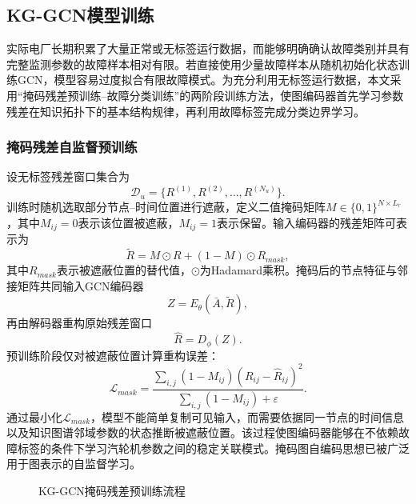 \subsection{KG-GCN模型训练}
\label{subsec:kg_gcn_training_v2}

实际电厂长期积累了大量正常或无标签运行数据，而能够明确确认故障类别并具有完整监测参数的故障样本相对有限。若直接使用少量故障样本从随机初始化状态训练GCN，模型容易过度拟合有限故障模式。为充分利用无标签运行数据，本文采用“掩码残差预训练--故障分类训练”的两阶段训练方法，使图编码器首先学习参数残差在知识拓扑下的基本结构规律，再利用故障标签完成分类边界学习。

\subsubsection{掩码残差自监督预训练}

设无标签残差窗口集合为
\begin{equation}
    \mathcal D_u=\{R^{(1)},R^{(2)},\ldots,R^{(N_u)}\}.
\end{equation}
训练时随机选取部分节点--时间位置进行遮蔽，定义二值掩码矩阵$M\in\{0,1\}^{N\times L_r}$，其中$M_{ij}=0$表示该位置被遮蔽，$M_{ij}=1$表示保留。输入编码器的残差矩阵可表示为
\begin{equation}
    \tilde R=M\odot R+(1-M)\odot R_{mask},
\end{equation}
其中$R_{mask}$表示被遮蔽位置的替代值，$\odot$为Hadamard乘积。掩码后的节点特征与邻接矩阵共同输入GCN编码器
\begin{equation}
    Z=E_{\theta}(\bar A,\tilde R),
\end{equation}
再由解码器重构原始残差窗口
\begin{equation}
    \hat R=D_{\phi}(Z).
\end{equation}
预训练阶段仅对被遮蔽位置计算重构误差：
\begin{equation}
    \mathcal L_{mask}=
    \frac{\sum_{i,j}(1-M_{ij})(R_{ij}-\hat R_{ij})^2}
    {\sum_{i,j}(1-M_{ij})+\varepsilon}.
\end{equation}
通过最小化$\mathcal L_{mask}$，模型不能简单复制可见输入，而需要依据同一节点的时间信息以及知识图谱邻域参数的状态推断被遮蔽位置。该过程使图编码器能够在不依赖故障标签的条件下学习汽轮机参数之间的稳定关联模式。掩码图自编码思想已被广泛用于图表示的自监督学习\cite{Hou2022GraphMAE}。

\begin{figure}[htbp]
    \centering
    \caption{KG-GCN掩码残差预训练流程}
    \label{fig:kg_gcn_pretrain_v2}
\end{figure}

